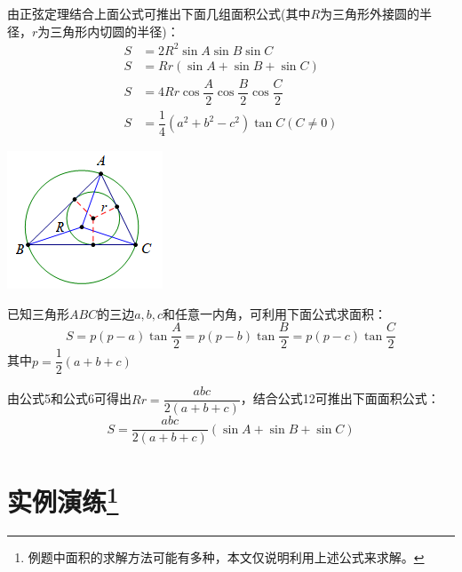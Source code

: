 \documentclass[10pt]{ctexart}
\begin{document}
\begin{minipage}[t]{0.7\textwidth}
\begin{dkyi}{}{}
由正弦定理结合上面公式可推出下面几组面积公式(其中$R$为三角形外接圆的半径，$r$为三角形内切圆的半径)：
\begin{align*}
S&=2R^2 \sin A\sin B\sin C\\
S&=Rr(\sin A+\sin B+\sin C)\\
S&=4Rr \cos{\dfrac{A}{2}}\cos{\dfrac{B}{2}}\cos{\dfrac{C}{2}}\\
S&=\dfrac{1}{4}(a^2+b^2-c^2)\tan C(C\neq 0)
\end{align*}
\end{dkyi}
\end{minipage}
\begin{minipage}[t]{0.3\textwidth}
\includegraphics[scale=1]{figure/mj-17.png}
\end{minipage}


\begin{minipage}[t]{0.7\textwidth}
\begin{dkyi}{}{}
已知三角形$ABC$的三边$a,b,c$和任意一内角，可利用下面公式求面积：
\[S=p(p-a)\tan{\dfrac{A}{2}}=p(p-b)\tan{\dfrac{B}{2}}=p(p-c)\tan{\dfrac{C}{2}}\]
其中$p=\dfrac{1}{2}(a+b+c)$
\end{dkyi}
\end{minipage}
\begin{minipage}[t]{0.3\textwidth}

\end{minipage}

\begin{minipage}[t]{0.7\textwidth}
\begin{dkyi}{}{}
由公式5和公式6可得出$Rr=\dfrac{abc}{2(a+b+c)}$，结合公式12可推出下面面积公式：
\[S=\dfrac{abc}{2(a+b+c)}(\sin{A}+\sin{B}+\sin{C})\]
\end{dkyi}
\end{minipage}
\begin{minipage}[t]{0.3\textwidth}

\end{minipage}

\section[实例演练he]{实例演练\footnote{例题中面积的求解方法可能有多种，本文仅说明利用上述公式来求解。}}
\end{document}
